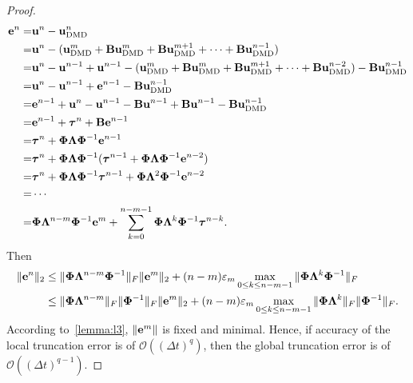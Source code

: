 \documentclass[10pt,a4paper]{amsart}
\begin{document}
\begin{proof}
\begin{equation}\label{eq:3-15}
\begin{aligned}
\bold e^n =& \bold u^n-\bold u_\text{DMD}^n\\
=&\bold u^n-(\bold u_\text{DMD}^m+\bold B\bold u_\text{DMD}^m+\bold B\bold u_\text{DMD}^{m+1}+\cdots+\bold B\bold u_\text{DMD}^{n-1})\\
=&\bold u^n-\bold u^{n-1}+\bold u^{n-1}-(\bold u_\text{DMD}^m+\bold B\bold u_\text{DMD}^m+\bold B\bold u_\text{DMD}^{m+1}+\cdots+\bold B\bold u_\text{DMD}^{n-2}) 
-\bold B\bold u_\text{DMD}^{n-1}\\
=&\bold u^n-\bold u^{n-1}+\bold e^{n-1}-\bold B\bold u_\text{DMD}^{n-1}\\
=&\bold e^{n-1}+\bold u^n-\bold u^{n-1}-\bold B\bold u^{n-1}+\bold B\bold u^{n-1}-\bold B\bold u_\text{DMD}^{n-1}\\
=&\bold e^{n-1}+\boldsymbol \tau^{n}+\bold B\bold e^{n-1}\\
=&\boldsymbol \tau^n+\boldsymbol\Phi\boldsymbol\Lambda\boldsymbol\Phi^{-1}\bold e^{n-1}\\
=&\boldsymbol \tau^n+\boldsymbol\Phi\boldsymbol\Lambda\boldsymbol\Phi^{-1} (\boldsymbol \tau^{n-1}+\boldsymbol\Phi\boldsymbol\Lambda\boldsymbol\Phi^{-1}\bold e^{n-2})\\
=&\boldsymbol \tau^n+\boldsymbol\Phi\boldsymbol\Lambda\boldsymbol\Phi^{-1}\boldsymbol \tau^{n-1}+\boldsymbol\Phi\boldsymbol\Lambda^2\boldsymbol\Phi^{-1}\bold e^{n-2}\\
=&\cdots\\
=&\boldsymbol\Phi\boldsymbol\Lambda^{n-m}\boldsymbol\Phi^{-1}\bold e^m+\sum_{k=0}^{n-m-1}\boldsymbol\Phi\boldsymbol\Lambda^k\boldsymbol\Phi^{-1}\boldsymbol \tau^{n-k}.
\end{aligned}
\end{equation}
Then 
\begin{equation}\label{eq:3-16}
\begin{aligned}
\|\bold e^n\|_2&\leq \|\boldsymbol\Phi\boldsymbol\Lambda^{n-m}\boldsymbol\Phi^{-1}\|_F\|\bold e^m\|_2+(n-m)\varepsilon_m\max_{0\leq k\leq n-m-1}\|\boldsymbol\Phi\boldsymbol\Lambda^k\boldsymbol\Phi^{-1}\|_F\\
&\leq  \|\boldsymbol\Phi\boldsymbol\Lambda^{n-m}\|_F\|\boldsymbol\Phi^{-1}\|_F\|\bold e^m\|_2+(n-m)\varepsilon_m\max_{0\leq k\leq n-m-1}\|\boldsymbol\Phi\boldsymbol\Lambda^k\|_F\|\boldsymbol\Phi^{-1}\|_F.
\end{aligned}
\end{equation}
According to~\cref{lemma:l3}, $\|\bold e^m\|$ is fixed and minimal. Hence, if accuracy of the local truncation error is of $\mathcal O((\Delta t)^q)$, then the global truncation error is of $\mathcal O((\Delta t)^{q-1})$.
\end{proof}
\end{document}
